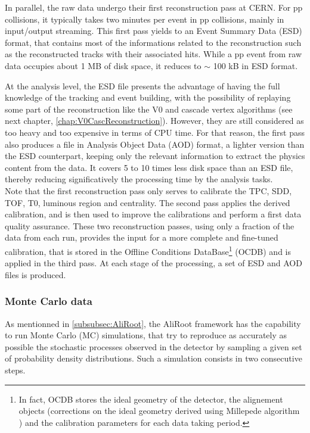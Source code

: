 In parallel, the raw data undergo their first reconstruction pass at CERN. For pp collisions, it typically takes two minutes per event in pp collisions, mainly in input/output streaming. This first pass yields to an Event Summary Data (ESD) format, that  contains most of the informations related to the reconstruction such as the reconstructed tracks with their associated hits. While a pp event from raw data occupies about 1 MB of disk space, it reduces to $\sim$ 100 kB in ESD format. 

At the analysis level, the ESD file presents the advantage of having the full knowledge of the tracking and event building, with the possibility of replaying some part of the reconstruction like the V0 and cascade vertex algorithms (see next chapter, \chap\ref{chap:V0CascReconstruction}). However, they are still considered as too heavy and too expensive in terms of CPU time. For that reason, the first pass also produces a file in Analysis Object Data (AOD) format, a lighter version than the ESD counterpart, keeping only the relevant information to extract the physics content from the data. It covers 5 to 10 times less disk space than an ESD file, thereby reducing significatively the processing time by the analysis tasks.\\

Note that the first reconstruction pass only serves to calibrate the TPC, SDD, TOF, T0, luminous region and centrality. The second pass applies the derived calibration, and is then used to improve the calibrations and perform a first data quality assurance. These two reconstruction passes, using only a fraction of the data from each run, provides the input for a more complete and fine-tuned calibration, that is stored in the Offline Conditions DataBase\footnote{In fact, OCDB stores the ideal geometry of the detector,  the alignement objects (\ie corrections on the ideal geometry derived using Millepede algorithm \cite{blobelNewMethodHighPrecision2002}) and the calibration parameters for each data taking period.} (OCDB) and is applied in the third pass. At each stage of the processing, a set of ESD and AOD files is produced. 

\subsubsection{Monte Carlo data}
\label{subsubsec:MCData}

As mentionned in \Sec\ref{subsubsec:AliRoot}, the AliRoot framework has the capability to run Monte Carlo (MC) simulations, that try to reproduce as accurately as possible the stochastic processes observed in the detector by sampling a given set of probability density distributions. Such a simulation consists in two consecutive steps.

